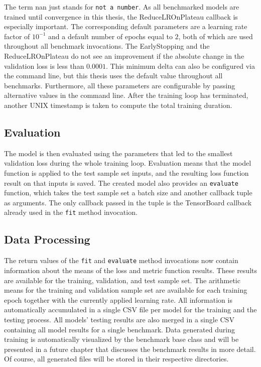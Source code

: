 \documentclass[draft,final]{vutinfth} %
\begin{document}
The term nan just stands for \texttt{not a number}.
As all benchmarked models are trained until convergence in this thesis, the ReduceLROnPlateau callback is especially important.
The corresponding default parameters are a learning rate factor of $10^{-1}$ and a default number of epochs equal to $2$, both of which are used throughout all benchmark invocations.
The EarlyStopping and the ReduceLROnPlateau do not see an improvement if the absolute change in the validation loss is less than $0.0001$.
This minimum delta can also be configured via the command line, but this thesis uses the default value throughout all benchmarks.
Furthermore, all these parameters are configurable by passing alternative values in the command line.
After the training loop has terminated, another UNIX timestamp is taken to compute the total training duration.

\subsection{Evaluation}
The model is then evaluated using the parameters that led to the smallest validation loss during the whole training loop.
Evaluation means that the model function is applied to the test sample set inputs, and the resulting loss function result on that inputs is saved.
The created model also provides an \texttt{evaluate} function, which takes the test sample set a batch size and another callback tuple as arguments.
The only callback passed in the tuple is the TensorBoard callback already used in the \texttt{fit} method invocation.

\subsection{Data Processing}
The return values of the \texttt{fit} and \texttt{evaluate} method invocations now contain information about the means of the loss and metric function results. These results are available for the training, validation, and test sample set.
The arithmetic means for the training and validation sample set are available for each training epoch together with the currently applied learning rate.
All information is automatically accumulated in a single CSV file per model for the training and the testing process.
All models' testing results are also merged in a single CSV containing all model results for a single benchmark.
Data generated during training is automatically visualized by the benchmark base class and will be presented in a future chapter that discusses the benchmark results in more detail.
Of course, all generated files will be stored in their respective directories.
\end{document}
